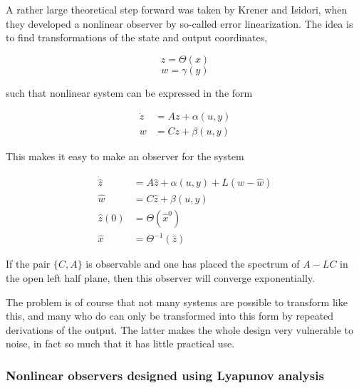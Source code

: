 A rather large theoretical step forward was taken by Krener and Isidori\cite{FirstErrorLinNonlinObs}, when they developed a nonlinear observer by so-called error linearization. The idea is to find transformations of the state and output coordinates, 

\begin{equation}
    z = \Theta(x)
\end{equation}
\begin{equation}
    w = \gamma(y)
\end{equation}

such that nonlinear system can be expressed in the form

\begin{align}
    \Dot{z} &= Az + \alpha(u,y) \\
    w &= Cz + \beta(u,y)
\end{align}

This makes it easy to make an observer for the system

\begin{align}
    \Dot{\hat{z}} &= A\hat{z} + \alpha(u,y) + L(w-\hat{w}) \\
    \hat{w} &= C\hat{z} + \beta(u,y) \\
    \hat{z}(0) &= \Theta(\hat{x}^0) \\ 
    \hat{x} &= \Theta^{-1}(\hat{z})
\end{align}

If the pair $\{C,A\}$ is observable and one has placed the spectrum of $A-LC$ in the open left half plane, then this observer will converge exponentially. 

The problem is of course that not many systems are possible to transform like this, and many who do can only be transformed into this form by repeated derivations of the output. The latter makes the whole design very vulnerable to noise, in fact so much that it has little practical use. 

\subsubsection{Nonlinear observers designed using Lyapunov analysis}

